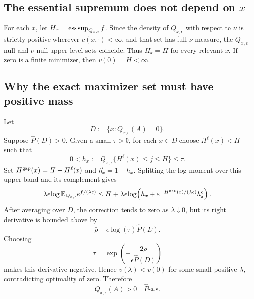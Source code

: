 \subsection{The essential supremum does not depend on $x$}
For each $x$, let $H_x=\operatorname*{ess\,sup}_{Q_{x,\epsilon}}f$.  Since the density of $Q_{x,\epsilon}$ with respect to $\nu$ is strictly positive wherever $c(x,\cdot)<\infty$, and that set has full $\nu$-measure, the $Q_{x,\epsilon}$-null and $\nu$-null upper level sets coincide.  Thus $H_x=H$ for every relevant $x$.  If zero is a finite minimizer, then $v(0)=H<\infty$.

\subsection{Why the exact maximizer set must have positive mass}
Let
\[
 D:=\{x:Q_{x,\epsilon}(A)=0\}.
\]
Suppose $\widehat P(D)>0$.  Given a small $\tau>0$, for each $x\in D$ choose $H^\ell(x)<H$ such that
\[
 0<h_x:=Q_{x,\epsilon}\{H^\ell(x)\le f\le H\}\le\tau.
\]
Set $H^{\rm gap}(x)=H-H^\ell(x)$ and $h_x^c=1-h_x$.  Splitting the log moment over this upper band and its complement gives
\begin{equation}\label{eq:WGX-gap-bound}
 \lambda\epsilon\log\mathbb{E}_{Q_{x,\epsilon}}e^{f/(\lambda\epsilon)}
 \le H+\lambda\epsilon
 \log\!\left(h_x+e^{-H^{\rm gap}(x)/(\lambda\epsilon)}h_x^c\right).
\end{equation}
After averaging over $D$, the correction tends to zero as $\lambda\downarrow0$, but its right derivative is bounded above by
\[
 \bar\rho+\epsilon\log(\tau)\widehat P(D).
\]
Choosing
\[
 \tau=\exp\!\left(-\frac{2\bar\rho}{\epsilon\widehat P(D)}\right)
\]
makes this derivative negative.  Hence $v(\lambda)<v(0)$ for some small positive $\lambda$, contradicting optimality of zero.  Therefore
\begin{equation}\label{eq:WGX-A-positive}
 Q_{x,\epsilon}(A)>0
 \quad\widehat P\text{-a.s.}
\end{equation}

